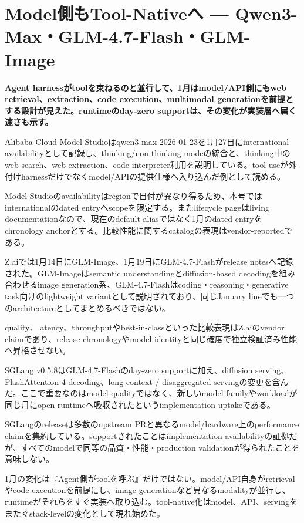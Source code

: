 \section{Model側もTool-Nativeへ — Qwen3-Max・GLM-4.7-Flash・GLM-Image}
\noindent\textbf{Agent harnessがtoolを束ねるのと並行して、1月はmodel/API側にもweb retrieval、extraction、code execution、multimodal generationを前提とする設計が見えた。runtimeのday-zero supportは、その変化が実装層へ届く速さも示す。}\autocite{src-6a97353d35a9,src-9156c37fb1c2,src-eac8dfbeb78c}

Alibaba Cloud Model Studioはqwen3-max-2026-01-23を1月27日にinternational availabilityとして記録し、thinking/non-thinking modeの統合と、thinking中のweb search、web extraction、code interpreter利用を説明している。tool useが外付けharnessだけでなくmodel/APIの提供仕様へ入り込んだ例として読める。\autocite{src-eac8dfbeb78c}


\begin{claimboundary}
Model Studioのavailabilityはregionで日付が異なり得るため、本号ではinternationalのdated entryへscopeを限定する。またlifecycle pageはliving documentationなので、現在のdefault aliasではなく1月のdated entryをchronology anchorとする。比較性能に関するcatalogの表現はvendor-reportedである。\autocite{src-eac8dfbeb78c}
\end{claimboundary}

Z.aiでは1月14日にGLM-Image、1月19日にGLM-4.7-Flashがrelease notesへ記録された。GLM-Imageはsemantic understandingとdiffusion-based decodingを組み合わせるimage generation系、GLM-4.7-Flashはcoding・reasoning・generative task向けのlightweight variantとして説明されており、同じJanuary lineでも一つのarchitectureとしてまとめるべきではない。\autocite{src-9156c37fb1c2}


\begin{claimboundary}
quality、latency、throughputやbest-in-classといった比較表現はZ.aiのvendor claimであり、release chronologyやmodel identityと同じ確度で独立検証済み性能へ昇格させない。\autocite{src-9156c37fb1c2}
\end{claimboundary}

SGLang v0.5.8はGLM-4.7-Flashのday-zero supportに加え、diffusion serving、FlashAttention 4 decoding、long-context / disaggregated-servingの変更を含んだ。ここで重要なのはmodel qualityではなく、新しいmodel familyやworkloadが同じ月にopen runtimeへ吸収されたというimplementation uptakeである。\autocite{src-6a97353d35a9}


\begin{claimboundary}
SGLangのreleaseは多数のupstream PRと異なるmodel/hardware上のperformance claimを集約している。supportされたことはimplementation availabilityの証拠だが、すべてのmodelで同等の品質・性能・production validationが得られたことを意味しない。\autocite{src-6a97353d35a9}
\end{claimboundary}

1月の変化は『Agent側がtoolを呼ぶ』だけではない。model/API自身がretrievalやcode executionを前提にし、image generationなど異なるmodalityが並行し、runtimeがそれらをすぐ実装へ取り込む。tool-native化はmodel、API、servingをまたぐstack-levelの変化として現れ始めた。\autocite{src-6a97353d35a9,src-9156c37fb1c2,src-eac8dfbeb78c}

